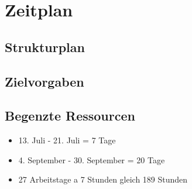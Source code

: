 \section{Zeitplan}
\subsection{Strukturplan}
\subsection{Zielvorgaben}
\subsection{Begenzte Ressourcen}
\begin{itemize}
    \item 13. Juli - 21. Juli = 7 Tage
    \item 4. September - 30. September = 20 Tage
    \item 27 Arbeitstage a 7 Stunden gleich 189 Stunden
\end{itemize}

